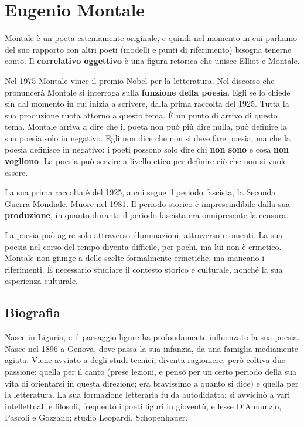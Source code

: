 \chapter{Eugenio Montale}


Montale è un poeta estemamente originale, e quindi nel momento in cui parliamo del suo rapporto con altri poeti (modelli e punti di riferimento) bisogna tenerne conto.
Il \textbf{correlativo oggettivo} è una figura retorica che unisce Elliot e Montale.

Nel 1975 Montale vince il premio Nobel per la letteratura. Nel discorso che pronuncerà Montale si interroga sulla \textbf{funzione della poesia}.
Egli se lo chiede sin dal momento in cui inizia a scrivere, dalla prima raccolta del 1925. Tutta la sua produzione ruota attorno a questo tema.
È un punto di arrivo di questo tema. Montale arriva a dire che il poeta non può più dire nulla, può definire la sua poesia solo in negativo. Egli non dice che non si deve fare poesia, ma che la poesia definisce in negativo: i poeti possono solo dire chi \textbf{non sono} e cosa \textbf{non vogliono}. La poesia può servire a livello etico per definire ciò che non si vuole essere.

La sua prima raccolta è del 1925, a cui segue il periodo fascista, la Seconda Guerra Mondiale. Muore nel 1981. Il periodo storico è imprescindibile dalla sua \textbf{produzione}, in quanto durante il periodo fascista era onnipresente la censura.

La poesia può agire solo attraverso illuminazioni, attraverso momenti. La sua poesia nel corso del tempo diventa difficile, per pochi, ma lui non è ermetico.
Montale non giunge a delle scelte formalmente ermetiche, ma mancano i riferimenti. È necessario studiare il contesto storico e culturale, nonché la sua esperienza culturale.

\section{Biografia}

Nasce in Liguria, e il paesaggio ligure ha profondamente influenzato la sua poesia. Nasce nel 1896 a Genova, dove passa la sua infanzia, da una famiglia mediamente agiata. Viene avviato a degli studi tecnici, diventa ragioniere, però coltiva due passione: quella per il canto (prese lezioni, e pensò per un certo periodo della sua vita di orientarsi in questa direzione; era bravissimo a quanto si dice) e quella per la letteratura. La sua formazione letteraria fu da autodidatta; si avvicinò a vari intellettuali e filosofi, frequentò i poeti liguri in gioventù, e lesse D'Annunzio, Pascoli e Gozzano; studiò Leopardi, Schopenhauer.

